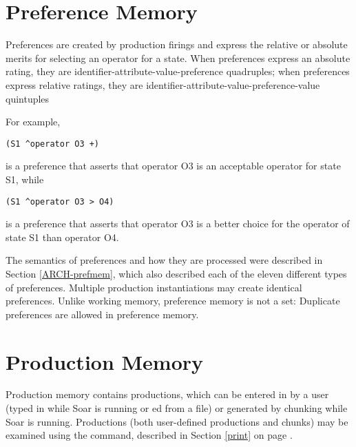 \section{Preference Memory}
\label{SYNTAX-prefmem}

Preferences are created by production firings and express the relative or absolute merits for selecting an operator for a state.  When preferences express an absolute rating, they are identifier-attribute-value-preference quadruples; when preferences express relative ratings, they are identifier-attribute-value-preference-value quintuples

For example, 

\begin{verbatim}
(S1 ^operator O3 +)
\end{verbatim}

is a preference that asserts that operator O3 is an acceptable operator for state S1, while

\begin{verbatim}
(S1 ^operator O3 > O4)
\end{verbatim}

is a preference that asserts that operator O3 is a better choice for the operator of state S1 than operator O4.

The semantics of preferences and how they are processed were described in Section \ref{ARCH-prefmem}, which also described each of the eleven different types of preferences.  Multiple production instantiations may create identical preferences. Unlike working memory, preference memory is not a set: Duplicate preferences are allowed in preference memory.


\section{Production Memory}
\label{SYNTAX-pm}

Production memory contains productions, which can be entered in by a user (typed in while Soar is running or ed from a file) or generated by chunking while Soar is running. Productions (both user-defined productions and chunks) may be examined using the  command, described in Section \ref{print} on page \pageref{print}.

